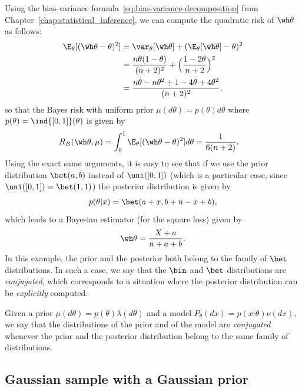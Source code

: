 Using the bias-variance formula~\eqref{eq:bias-variance-decomposition} from Chapter~\ref{chap:statistical_inference}, we can compute the quadratic risk of $\wh \theta$ as follows:
\begin{align*}
	\E_\theta[ (\wh \theta - \theta)^2] &= \var_\theta[\wh \theta] + (\E_\theta[\wh \theta] - \theta)^2 \\
	&= \frac{n \theta(1 - \theta)}{(n + 2)^2} + \Big(\frac{1 - 2 \theta}{n + 2} \Big)^2 \\
	&= \frac{n \theta - n \theta^2 + 1 - 4 \theta + 4 \theta^2}{(n+2)^2},
\end{align*}
so that the Bayes risk with uniform prior $\mu(d \theta) = p(\theta) d\theta$ where $p(\theta) = \ind{[0, 1]}(\theta)$ is given by
\begin{align*}
	R_B(\wh \theta, \mu) &= \int_0^1 \E_\theta[ (\wh \theta - \theta)^2] d \theta 
	= \frac{1}{6(n+2)}.
\end{align*}
Using the exact same arguments, it is easy to see that if we use the prior distribution $\bet(a, b)$ instead of $\uni([0, 1])$ (which is a particular case, since $\uni([0, 1]) = \bet(1, 1)$) the posterior distribution is given by
\begin{equation*}
	p(\theta | x) = \bet(a + x, b + n - x + b),
\end{equation*}
which leads to a Bayesian estimator (for the square loss) given by
\begin{equation*}
	\wh \theta = \frac{X + a}{n + a + b}.
\end{equation*}
In this example, the prior and the posterior both belong to the family of $\bet$ distributions. 
In such a case, we say that the $\bin$ and $\bet$ distributions are \emph{conjugated}, which corresponds to a situation where the posterior distribution can be \emph{explicitly} computed.
\begin{definition}
	Given a prior $\mu(d \theta) = p(\theta) \lambda(d \theta)$ and a model $P_\theta(dx) = p(x | \theta) \nu(dx)$, we say that the distributions of the prior and of the model are \emph{conjugated} whenever the prior and the posterior distribution belong to the same family of distributions.
\end{definition}


\subsection{Gaussian sample with a Gaussian prior}

